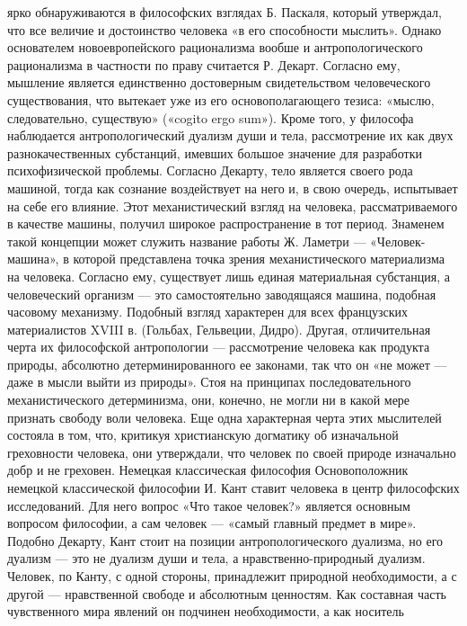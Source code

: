 \documentclass[12pt]{article}
\begin{document}
ярко обнаруживаются в философских взглядах Б. Паскаля, который утверждал, что все величие и достоинство
человека «в его способности мыслить».
Однако основателем новоевропейского рационализма вообше и антропологического рационализма в частности 
по праву считается Р. Декарт. Согласно ему, мышление является единственно достоверным свидетельством
человеческого существования, что вытекает уже из его основополагающего тезиса: «мыслю, следовательно,
существую» («cogito ergo sum»). Кроме того, у философа наблюдается антропологический дуализм души и тела,
рассмотрение  их  как  двух  разнокачественных  субстанций,  имевших  большое  значение  для  разработки
психофизической  проблемы.  Согласно  Декарту,  тело  является  своего  рода  машиной,  тогда  как  сознание
воздействует на него и, в свою очередь, испытывает на себе его влияние.
Этот  механистический  взгляд  на  человека,  рассматриваемого  в  качестве  машины,  получил  широкое
распространение в тот период. Знаменем такой концепции может служить название работы Ж. Ламетри —
«Человек-машина»,  в  которой  представлена  точка  зрения  механистического  материализма  на  человека.
Согласно  ему,  существует  лишь  единая  материальная  субстанция,  а  человеческий  организм  —  это
самостоятельно заводящаяся машина, подобная часовому механизму.
Подобный взгляд характерен для всех французских материалистов XVIII в. (Гольбах, Гельвеции, Дидро).
Другая, отличительная черта их философской антропологии — рассмотрение человека как продукта природы,
абсолютно детерминированного ее законами, так что он «не может — даже в мысли выйти из природы». Стоя на
принципах  последовательного  механистического  детерминизма,  они,  конечно,  не  могли  ни  в  какой  мере
признать свободу воли человека. Еще одна характерная черта этих мыслителей состояла в том, что, критикуя
христианскую догматику об изначальной греховности человека, они утверждали, что человек по своей природе
изначально добр и не греховен.
Немецкая классическая философия
Основоположник  немецкой  классической  философии  И.  Кант  ставит  человека  в  центр  философских
исследований. Для него вопрос «Что такое человек?» является основным вопросом философии, а сам человек
— «самый главный предмет в мире». Подобно Декарту, Кант стоит на позиции антропологического дуализма,
но его дуализм — это не дуализм души и тела, а нравственно-природный дуализм. Человек, по Канту, с одной
стороны,  принадлежит  природной  необходимости,  а  с  другой  —  нравственной  свободе  и  абсолютным
ценностям.  Как  составная  часть  чувственного  мира  явлений  он  подчинен  необходимости,  а  как  носитель
\end{document}
